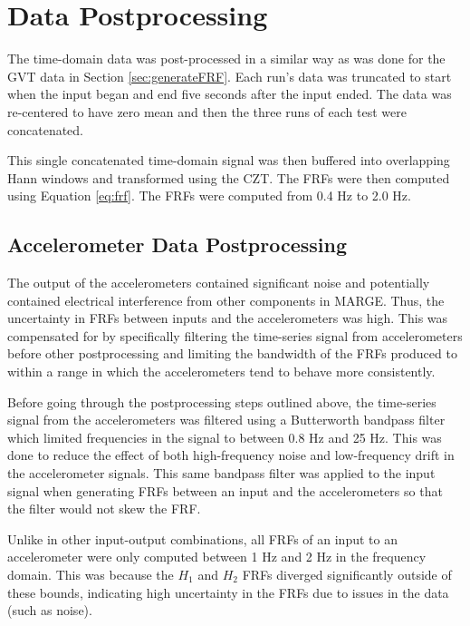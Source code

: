 \section{Data Postprocessing} %

The time-domain data was post-processed in a similar way as was done for the GVT data in Section \ref{sec:generateFRF}. Each run's data was truncated to start when the input began and end five seconds after the input ended. The data was re-centered to have zero mean and then the three runs of each test were concatenated.

This single concatenated time-domain signal was then buffered into overlapping Hann windows and transformed using the CZT. The FRFs were then computed using Equation \ref{eq:frf}. The FRFs were computed from 0.4 Hz to 2.0 Hz.

\subsection{Accelerometer Data Postprocessing} %
\label{sec:accDataPost}

The output of the accelerometers contained significant noise and potentially contained electrical interference from other components in MARGE. Thus, the uncertainty in FRFs between inputs and the accelerometers was high. This was compensated for by specifically filtering the time-series signal from accelerometers before other postprocessing and limiting the bandwidth of the FRFs produced to within a range in which the accelerometers tend to behave more consistently.

Before going through the postprocessing steps outlined above, the time-series signal from the accelerometers was filtered using a Butterworth bandpass filter which limited frequencies in the signal to between 0.8 Hz and 25 Hz. This was done to reduce the effect of both high-frequency noise and low-frequency drift in the accelerometer signals. This same bandpass filter was applied to the input signal when generating FRFs between an input and the accelerometers so that the filter would not skew the FRF.

Unlike in other input-output combinations, all FRFs of an input to an accelerometer were only computed between 1 Hz and 2 Hz in the frequency domain. This was because the $H_1$ and $H_2$ FRFs diverged significantly outside of these bounds, indicating high uncertainty in the FRFs due to issues in the data (such as noise).